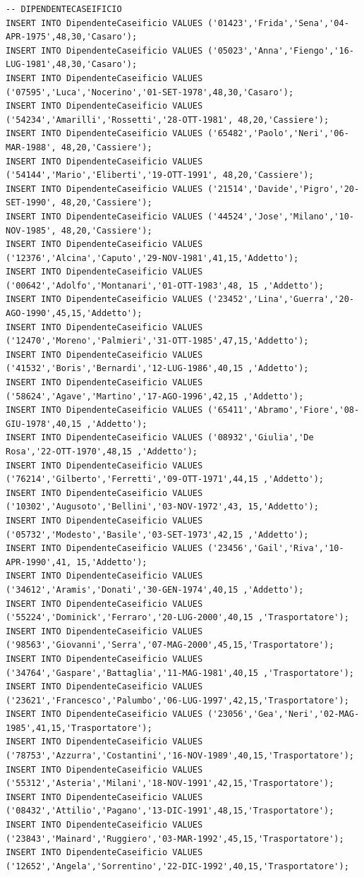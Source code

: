 \documentclass[12pt]{report}
\begin{document}
\begin{scriptsize}
\begin{verbatim}
-- DIPENDENTECASEIFICIO
INSERT INTO DipendenteCaseificio VALUES ('01423','Frida','Sena','04-APR-1975',48,30,'Casaro');
INSERT INTO DipendenteCaseificio VALUES ('05023','Anna','Fiengo','16-LUG-1981',48,30,'Casaro');
INSERT INTO DipendenteCaseificio VALUES ('07595','Luca','Nocerino','01-SET-1978',48,30,'Casaro');
INSERT INTO DipendenteCaseificio VALUES ('54234','Amarilli','Rossetti','28-OTT-1981', 48,20,'Cassiere');
INSERT INTO DipendenteCaseificio VALUES ('65482','Paolo','Neri','06-MAR-1988', 48,20,'Cassiere');
INSERT INTO DipendenteCaseificio VALUES ('54144','Mario','Eliberti','19-OTT-1991', 48,20,'Cassiere');
INSERT INTO DipendenteCaseificio VALUES ('21514','Davide','Pigro','20-SET-1990', 48,20,'Cassiere');
INSERT INTO DipendenteCaseificio VALUES ('44524','Jose','Milano','10-NOV-1985', 48,20,'Cassiere');
INSERT INTO DipendenteCaseificio VALUES ('12376','Alcina','Caputo','29-NOV-1981',41,15,'Addetto');
INSERT INTO DipendenteCaseificio VALUES ('00642','Adolfo','Montanari','01-OTT-1983',48, 15 ,'Addetto');
INSERT INTO DipendenteCaseificio VALUES ('23452','Lina','Guerra','20-AGO-1990',45,15,'Addetto');
INSERT INTO DipendenteCaseificio VALUES ('12470','Moreno','Palmieri','31-OTT-1985',47,15,'Addetto');
INSERT INTO DipendenteCaseificio VALUES ('41532','Boris','Bernardi','12-LUG-1986',40,15 ,'Addetto');
INSERT INTO DipendenteCaseificio VALUES ('58624','Agave','Martino','17-AGO-1996',42,15 ,'Addetto');
INSERT INTO DipendenteCaseificio VALUES ('65411','Abramo','Fiore','08-GIU-1978',40,15 ,'Addetto');
INSERT INTO DipendenteCaseificio VALUES ('08932','Giulia','De Rosa','22-OTT-1970',48,15 ,'Addetto');
INSERT INTO DipendenteCaseificio VALUES ('76214','Gilberto','Ferretti','09-OTT-1971',44,15 ,'Addetto');
INSERT INTO DipendenteCaseificio VALUES ('10302','Augusoto','Bellini','03-NOV-1972',43, 15,'Addetto');
INSERT INTO DipendenteCaseificio VALUES ('05732','Modesto','Basile','03-SET-1973',42,15 ,'Addetto');
INSERT INTO DipendenteCaseificio VALUES ('23456','Gail','Riva','10-APR-1990',41, 15,'Addetto');
INSERT INTO DipendenteCaseificio VALUES ('34612','Aramis','Donati','30-GEN-1974',40,15 ,'Addetto');
INSERT INTO DipendenteCaseificio VALUES ('55224','Dominick','Ferraro','20-LUG-2000',40,15 ,'Trasportatore');
INSERT INTO DipendenteCaseificio VALUES ('98563','Giovanni','Serra','07-MAG-2000',45,15,'Trasportatore');
INSERT INTO DipendenteCaseificio VALUES ('34764','Gaspare','Battaglia','11-MAG-1981',40,15 ,'Trasportatore');
INSERT INTO DipendenteCaseificio VALUES ('23621','Francesco','Palumbo','06-LUG-1997',42,15,'Trasportatore');
INSERT INTO DipendenteCaseificio VALUES ('23056','Gea','Neri','02-MAG-1985',41,15,'Trasportatore');
INSERT INTO DipendenteCaseificio VALUES ('78753','Azzurra','Costantini','16-NOV-1989',40,15,'Trasportatore');
INSERT INTO DipendenteCaseificio VALUES ('55312','Asteria','Milani','18-NOV-1991',42,15,'Trasportatore');
INSERT INTO DipendenteCaseificio VALUES ('08432','Attilio','Pagano','13-DIC-1991',48,15,'Trasportatore');
INSERT INTO DipendenteCaseificio VALUES ('23843','Mainard','Ruggiero','03-MAR-1992',45,15,'Trasportatore');
INSERT INTO DipendenteCaseificio VALUES ('12652','Angela','Sorrentino','22-DIC-1992',40,15,'Trasportatore');


\end{verbatim}
\end{scriptsize}
\end{document}
